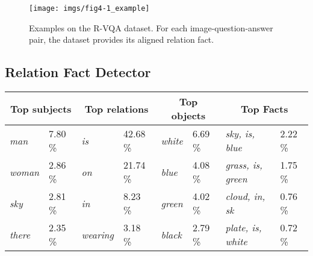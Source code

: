 \documentclass[sigconf]{acmart}
\begin{document}
\begin{figure}[t]
	\centering
	\texttt{[image: imgs/fig4-1\_example]}
	\caption{Examples on the R-VQA dataset. For each image-question-answer pair, the dataset provides its aligned relation fact.}
	\label{rvqa_example}
\end{figure}


\subsection{Relation Fact Detector}  \label{subsection:42} 
\begin{table}[t]
	\centering 
\footnotesize
\begin{tabular}{*8{l}} 
		\toprule	
		\multicolumn{2}{c}{Top subjects}  & \multicolumn{2}{c}{Top relations} & \multicolumn{2}{c}{Top objects}& \multicolumn{2}{c}{Top Facts}  \\
		\midrule
		\textit{man} \hspace{-2mm}   &   7.80 \%   
		&  \textit{is} \hspace{-2mm}   &   42.68 \%  
		& \textit{white} \hspace{-2mm}   &   6.69 \%  
		&   \textit{sky, is, blue} \hspace{-2mm}   &   2.22 \%  \\
		
		\textit{woman}\hspace{-2mm}    &   2.86 \%   
		& \textit{on} \hspace{-2mm}   &   21.74 \%  
		& \textit{blue} \hspace{-2mm}   &   4.08 \%  
		& \textit{grass, is, green} \hspace{-2mm}   &   1.75 \% \\
		
		\textit{sky} \hspace{-2mm}   &   2.81 \% 
		& \textit{in} \hspace{-2mm}   &   8.23 \%  
		& \textit{green} \hspace{-2mm}   &   4.02 \%  
		& \textit{cloud, in, sk} \hspace{-2mm}   &   0.76 \% \\
		
		\textit{there} \hspace{-2mm}   &   2.35 \%  
		& \textit{wearing} \hspace{-2mm}   &   3.18 \%  
		& \textit{black} \hspace{-2mm}   &   2.79 \%  
		&  \textit{plate, is, white} \hspace{-2mm}   &   0.72 \% \\
		

\end{tabular}
\end{table}
\end{document}
